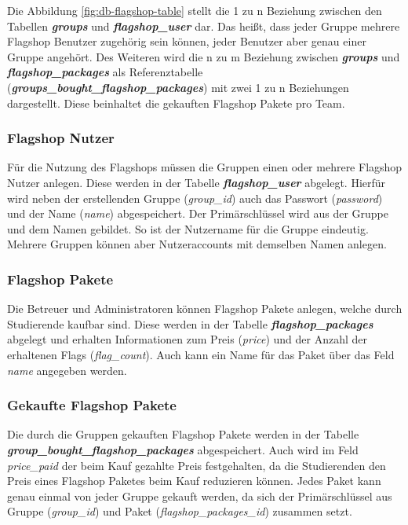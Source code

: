 Die Abbildung \ref{fig:db-flagshop-table} stellt die 1 zu n Beziehung zwischen den Tabellen \textbf{\textit{groups}} und \textbf{\textit{flagshop\_user}} dar. Das heißt, dass jeder Gruppe mehrere Flagshop Benutzer zugehörig sein können, jeder Benutzer aber genau einer Gruppe angehört. Des Weiteren wird die n zu m Beziehung zwischen \textbf{\textit{groups}} und \textbf{\textit{flagshop\_packages}} als Referenztabelle\\ (\textbf{\textit{groups\_bought\_flagshop\_packages}}) mit zwei 1 zu n Beziehungen dargestellt. Diese beinhaltet die gekauften Flagshop Pakete pro Team.

\subsubsection{Flagshop Nutzer}
Für die Nutzung des Flagshops müssen die Gruppen einen oder mehrere Flagshop Nutzer anlegen. Diese werden in der Tabelle \textbf{\textit{flagshop\_user}} abgelegt. Hierfür wird neben der erstellenden Gruppe (\textit{group\_id}) auch das Passwort (\textit{password}) und der Name (\textit{name})  abgespeichert. Der Primärschlüssel wird aus der Gruppe und dem Namen gebildet. So ist der Nutzername für die Gruppe eindeutig. Mehrere Gruppen können aber Nutzeraccounts mit demselben Namen anlegen.

\subsubsection{Flagshop Pakete}
Die Betreuer und Administratoren können Flagshop Pakete anlegen, welche durch Studierende kaufbar sind. Diese werden in der Tabelle \textbf{\textit{flagshop\_packages}} abgelegt und erhalten Informationen zum Preis (\textit{price}) und der Anzahl der erhaltenen Flags (\textit{flag\_count}). Auch kann ein Name für das Paket über das Feld \textit{name} angegeben werden.

\subsubsection{Gekaufte Flagshop Pakete}
Die durch die Gruppen gekauften Flagshop Pakete werden in der Tabelle\\ \textbf{\textit{group\_bought\_flagshop\_packages}} abgespeichert. Auch wird im Feld \textit{price\_paid} der beim Kauf gezahlte Preis festgehalten, da die Studierenden den Preis eines Flagshop Paketes beim Kauf reduzieren können. Jedes Paket kann genau einmal von jeder Gruppe gekauft werden, da sich der Primärschlüssel aus Gruppe (\textit{group\_id}) und Paket (\textit{flagshop\_packages\_id}) zusammen setzt.

